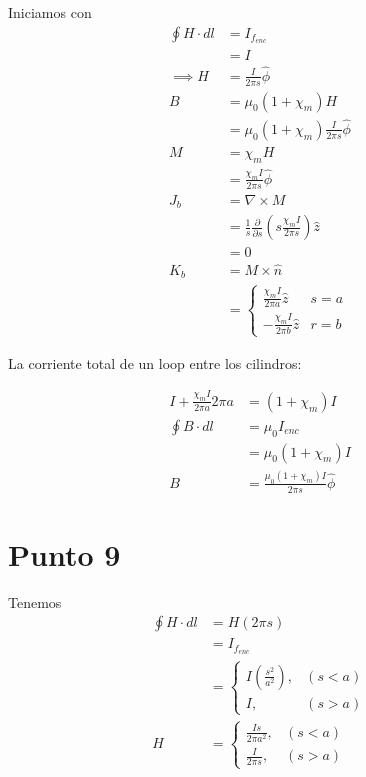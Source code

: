 \documentclass{report}
\begin{document}
Iniciamos con
\begin{align*}
  \oint H \cdot d l &= I_{f_{enc}}\\
  &= I\\
  \implies H &= \frac{I}{2\pi s}\hat{\phi}\\
  B &= \mu_0 (1 + \chi_m)H\\
  &= \mu_0 (1 + \chi_m) \frac{I}{2\pi s}\hat{\phi}\\
  M &= \chi_m H\\
  &= \frac{\chi_m I}{2\pi s}\hat{\phi}\\
  J_b &= \nabla \times M\\
  &= \frac{1}{s}\frac{\partial}{\partial s}\left(s \frac{\chi_m I}{2\pi s} \right)\hat{z}\\
  &= 0\\
  K_b &= M \times \hat{n}\\
  &= \begin{cases}
    \frac{\chi_m I}{2\pi a}\hat{z} & s = a\\
    -\frac{\chi_m I}{2\pi b}\hat{z} & r = b
  \end{cases}
\end{align*}

La corriente total de un loop entre los cilindros:

\begin{align*}
  I + \frac{\chi_m I}{2\pi a} 2\pi a &= (1 + \chi_m)I\\
  \oint B \cdot dl &= \mu_0 I_{enc}\\
  &= \mu_0 (1 + \chi_m) I\\
  B &= \frac{\mu_0(1 + \chi_m)I}{2\pi s}\hat{\phi}
\end{align*}

\chapter{Punto 9}

Tenemos
\begin{align*}
  \oint H \cdot dl &= H (2\pi s)\\
  &= I_{f_{enc}}\\
  &= \begin{cases}
    I \left(\frac{s^2}{a^2}\right), & (s < a)\\
    I, & (s > a)
  \end{cases}\\
  H &= \begin{cases}
    \frac{Is}{2\pi a^2}, & (s < a)\\
    \frac{I}{2\pi s}, & (s > a)
  \end{cases}
\end{align*}
\end{document}
